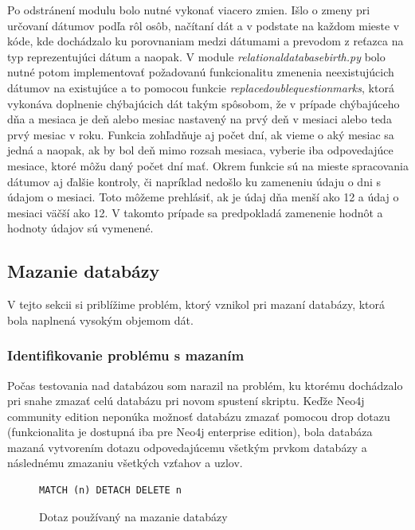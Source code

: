 Po odstránení modulu bolo nutné vykonať viacero zmien. Išlo o zmeny pri určovaní dátumov podľa rôl osôb, načítaní dát a v podstate na každom mieste v kóde, kde dochádzalo ku porovnaniam medzi dátumami a prevodom z reťazca na typ reprezentujúci dátum a naopak. V module \textit{relational\textunderscore database\textunderscore birth.py} bolo nutné potom implementovať požadovanú funkcionalitu zmenenia neexistujúcich dátumov na existujúce a to pomocou funkcie \textit{replace\textunderscore double\textunderscore questionmarks}, ktorá vykonáva doplnenie chýbajúcich dát takým spôsobom, že v prípade chýbajúceho dňa a mesiaca je deň alebo mesiac nastavený na prvý deň v mesiaci alebo teda prvý mesiac v roku. Funkcia zohľadňuje aj počet dní, ak vieme o aký mesiac sa jedná a naopak, ak by bol deň mimo rozsah mesiaca, vyberie iba odpovedajúce mesiace, ktoré môžu daný počet dní mať. Okrem funkcie sú na mieste spracovania dátumov aj ďalšie kontroly, či napríklad nedošlo ku zameneniu údaju o dni s údajom o mesiaci. Toto môžeme prehlásiť, ak je údaj dňa menší ako 12 a údaj o mesiaci väčší ako 12. V takomto prípade sa predpokladá zamenenie hodnôt a hodnoty údajov sú vymenené.

\subsection{Mazanie databázy}

V tejto sekcii si priblížime problém, ktorý vznikol pri mazaní databázy, ktorá bola naplnená vysokým objemom dát.

\subsubsection{Identifikovanie problému s mazaním}

Počas testovania nad databázou som narazil na problém, ku ktorému dochádzalo pri snahe zmazať celú databázu pri novom spustení skriptu. Keďže Neo4j community edition neponúka možnosť databázu zmazať pomocou drop dotazu (funkcionalita je dostupná iba pre Neo4j enterprise edition), bola databáza mazaná vytvorením dotazu odpovedajúcemu všetkým prvkom databázy a následnému zmazaniu všetkých vzťahov a uzlov.

\begin{figure}[h]
\label{deletion}
\begin{lstlisting}[language=SPARQL]
                            MATCH (n) DETACH DELETE n
\end{lstlisting}
\caption{Dotaz používaný na mazanie databázy}
\end{figure}

